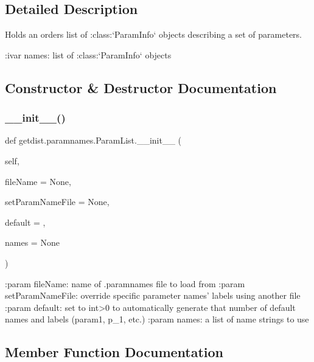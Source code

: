 \subsection{Detailed Description}
\begin{DoxyVerb}Holds an orders list of :class:`ParamInfo` objects describing a set of parameters.
    
:ivar names: list of :class:`ParamInfo` objects
\end{DoxyVerb}
 

\subsection{Constructor \& Destructor Documentation}
\mbox{\label{classgetdist_1_1paramnames_1_1ParamList_a2c1b6ecbcd158c986ed292dd08d9d1fb}} 
\subsubsection{\texorpdfstring{\+\_\+\+\_\+init\+\_\+\+\_\+()}{\_\_init\_\_()}}
{\footnotesize\ttfamily def getdist.\+paramnames.\+Param\+List.\+\_\+\+\_\+init\+\_\+\+\_\+ (\begin{DoxyParamCaption}\item[{}]{self,  }\item[{}]{file\+Name = {\ttfamily None},  }\item[{}]{set\+Param\+Name\+File = {\ttfamily None},  }\item[{}]{default = {},  }\item[{}]{names = {\ttfamily None} }\end{DoxyParamCaption})}

\begin{DoxyVerb}:param fileName: name of .paramnames file to load from
:param setParamNameFile: override specific parameter names' labels using another file
:param default: set to int>0 to automatically generate that number of default names and labels (param1, p_{1}, etc.)
:param names: a list of name strings to use
\end{DoxyVerb}
 

\subsection{Member Function Documentation}
\mbox{\label{classgetdist_1_1paramnames_1_1ParamList_a8366c518269bbc00de2f25fc8596628d}} 

